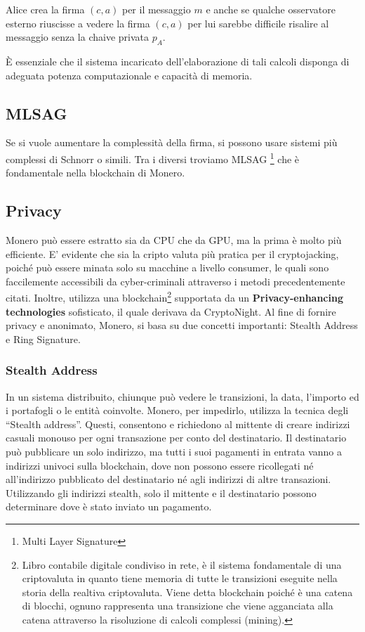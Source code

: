 \documentclass[12pt,a4paper]{article}
\begin{document}
Alice crea la firma $ (c, a) $ per il messaggio $ m $ e anche se qualche osservatore
esterno riuscisse a vedere la firma $ (c, a) $ per lui sarebbe difficile
risalire al messaggio senza la chaive privata $ p_A $.

È essenziale che il sistema incaricato dell'elaborazione di tali calcoli
disponga di adeguata potenza computazionale e capacità di memoria. 

\subsection{MLSAG}

Se si vuole aumentare la complessità della firma, si possono usare sistemi 
più complessi di Schnorr o simili. Tra i diversi troviamo MLSAG \footnote{Multi Layer
Signature} che è fondamentale nella blockchain di Monero.


\subsection{Privacy}

Monero può essere estratto sia da CPU che da GPU, ma la prima è molto più
efficiente. E' evidente che sia la cripto valuta più pratica per il
cryptojacking, poiché può essere minata solo su macchine a livello consumer, le
quali sono faccilemente accessibili da cyber-criminali attraverso i metodi
precedentemente citati. Inoltre, utilizza una blockchain\footnote{Libro
contabile digitale condiviso in rete, è il sistema fondamentale di una
criptovaluta in quanto tiene memoria di tutte le transizioni eseguite nella
storia della realtiva criptovaluta. Viene detta blockchain poiché è una catena
di blocchi, ognuno rappresenta una transizione che viene agganciata alla catena
attraverso la risoluzione di calcoli complessi (mining).} supportata da un
\textbf{Privacy-enhancing technologies} sofisticato, il quale derivava da
CryptoNight. Al fine di fornire privacy e anonimato, Monero, si basa su due
concetti importanti: Stealth Address e Ring Signature.

\subsubsection{Stealth Address}
    In un sistema distribuito, chiunque può vedere le transizioni, la data,
    l'importo ed i portafogli o le entità coinvolte. Monero, per impedirlo,
    utilizza la tecnica degli “Stealth address”. Questi, consentono e richiedono
    al mittente di creare indirizzi casuali monouso per ogni transazione per
    conto del destinatario. Il destinatario può pubblicare un solo indirizzo, ma
    tutti i suoi pagamenti in entrata vanno a indirizzi univoci sulla
    blockchain, dove non possono essere ricollegati né all'indirizzo pubblicato
    del destinatario né agli indirizzi di altre transazioni. Utilizzando gli
    indirizzi stealth, solo il mittente e il destinatario possono determinare
    dove è stato inviato un pagamento.
\end{document}
